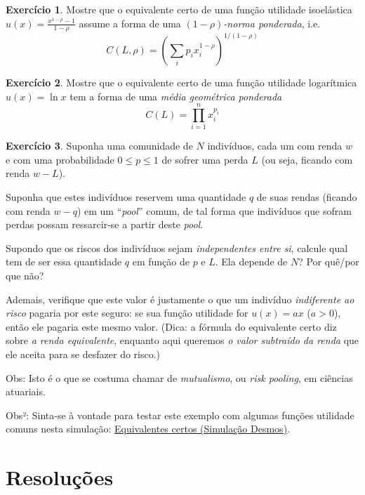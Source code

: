 \documentclass[12pt]{article}
\numberwithin{equation}{section}
\theoremstyle{plain}
\theoremstyle{definition}
\newtheorem{exercise}{Exercício}[section]
\theoremstyle{remark}
\begin{document}
\begin{exercise}
Mostre que o equivalente certo de uma função utilidade isoelástica
\(u(x) = \frac{x^{1-\rho}-1}{1-\rho}\) assume a forma de uma
\textit{\((1-\rho)\)-norma ponderada}, i.e.~
\[
   C(L, \rho) = \left( \sum \limits_{i} p_{i} x_{i}^{1-\rho} \right)^{1/(1-\rho)}
   \]

\end{exercise}

\begin{exercise}
Mostre que o equivalente certo de uma função utilidade logarítmica
\(u(x) = \ln x\) tem a forma de uma \textit{média geométrica ponderada}
\[
C(L) = \prod \limits_{i=1}^{n} x_{i}^{p_{i}}
\]

\end{exercise}

\begin{exercise}
\parencite[, p. 230-1]{Varian2014} Suponha uma comunidade de \(N\)
indivíduos, cada um com renda \(w\) e com uma probabilidade
\(0\leq p \leq 1\) de sofrer uma perda \(L\) (ou seja, ficando com renda
\(w-L\)).

Suponha que estes indivíduos reservem uma quantidade \(q\) de suas
rendas (ficando com renda \(w-q\)) em um ``\textit{pool}'' comum, de tal
forma que indivíduos que sofram perdas possam ressarcir-se a partir
deste \textit{pool}.

Supondo que os riscos dos indivíduos sejam \textit{independentes entre
si}, calcule qual tem de ser essa quantidade \(q\) em função de \(p\) e
\(L\). Ela depende de \(N\)? Por quê/por que não?

Ademais, verifique que este valor é justamente o que um indivíduo
\textit{indiferente ao risco} pagaria por este seguro: se sua função
utilidade for \(u(x) = ax\) (\(a>0\)), então ele pagaria este mesmo
valor. (Dica: a fórmula do equivalente certo diz sobre \textit{a renda
equivalente}, enquanto aqui queremos \textit{o valor subtraído da renda}
que ele aceita para se desfazer do risco.)

Obs: Isto é o que se costuma chamar de \textit{mutualismo}, ou
\textit{risk pooling}, em ciências atuariais.

Obs²: Sinta-se à vontade para testar este exemplo com algumas funções
utilidade comuns nesta simulação:
\href{https://www.desmos.com/calculator/quce5bk5v5}{Equivalentes certos
(Simulação Desmos)}.
\end{exercise}

\hypertarget{resoluuxe7uxf5es}{%
\section{Resoluções}\label{resoluuxe7uxf5es}}
\end{document}
